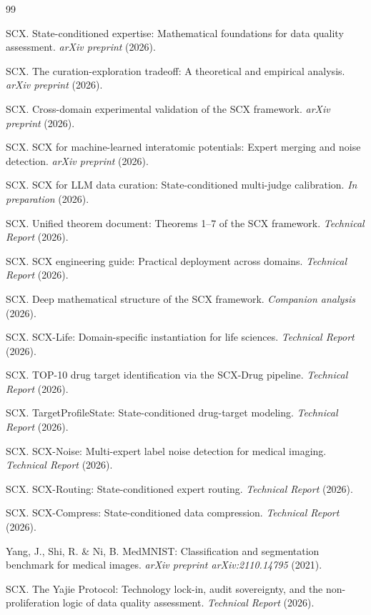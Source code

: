 \documentclass[twocolumn]{article}
\theoremstyle{definition}
\begin{document}
\begin{thebibliography}{99}

SCX. State-conditioned expertise: Mathematical foundations for data quality assessment. \emph{arXiv preprint} (2026).

SCX. The curation-exploration tradeoff: A theoretical and empirical analysis. \emph{arXiv preprint} (2026).

SCX. Cross-domain experimental validation of the SCX framework. \emph{arXiv preprint} (2026).

SCX. SCX for machine-learned interatomic potentials: Expert merging and noise detection. \emph{arXiv preprint} (2026).

SCX. SCX for LLM data curation: State-conditioned multi-judge calibration. \emph{In preparation} (2026).

SCX. Unified theorem document: Theorems 1--7 of the SCX framework. \emph{Technical Report} (2026).

SCX. SCX engineering guide: Practical deployment across domains. \emph{Technical Report} (2026).

SCX. Deep mathematical structure of the SCX framework. \emph{Companion analysis} (2026).

SCX. SCX-Life: Domain-specific instantiation for life sciences. \emph{Technical Report} (2026).

SCX. TOP-10 drug target identification via the SCX-Drug pipeline. \emph{Technical Report} (2026).

SCX. TargetProfileState: State-conditioned drug-target modeling. \emph{Technical Report} (2026).

SCX. SCX-Noise: Multi-expert label noise detection for medical imaging. \emph{Technical Report} (2026).

SCX. SCX-Routing: State-conditioned expert routing. \emph{Technical Report} (2026).

SCX. SCX-Compress: State-conditioned data compression. \emph{Technical Report} (2026).

Yang, J., Shi, R. \& Ni, B. MedMNIST: Classification and segmentation benchmark for medical images. \emph{arXiv preprint arXiv:2110.14795} (2021).

SCX. The Yajie Protocol: Technology lock-in, audit sovereignty, and the non-proliferation logic of data quality assessment. \emph{Technical Report} (2026).

\end{thebibliography}
\end{document}
